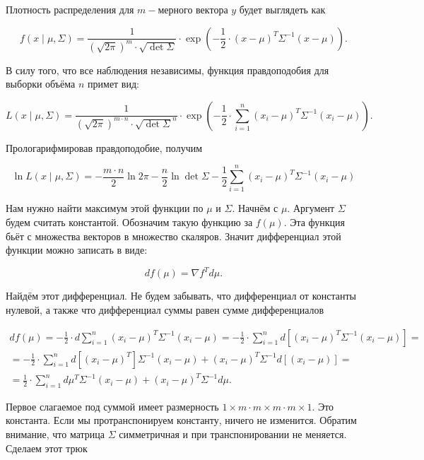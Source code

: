 \begin{sol} 

Плотность распределения для $m-$мерного вектора $y$ будет выглядеть как 
	
	\[ 
	f(x \mid \mu, \Sigma) = \frac{1}{(\sqrt{2 \pi})^m \cdot \sqrt{\det \Sigma}} \cdot \exp \left( - \frac{1}{2} \cdot (x - \mu)^T \Sigma^{-1} (x - \mu) \right).
	\]
	
	В силу того, что все наблюдения независимы, функция правдоподобия для выборки объёма $n$ примет вид: 
	
	\[
	L(x \mid \mu, \Sigma) = \frac{1}{(\sqrt{2 \pi})^{m \cdot n} \cdot \sqrt{\det \Sigma}^n} \cdot \exp \left( - \frac{1}{2} \cdot \sum_{i = 1}^n (x_i - \mu)^T \Sigma^{-1} (x_i - \mu) \right).
	\]
	
	Прологарифмировав правдоподобие, получим
	
	\[
	\ln L(x \mid \mu, \Sigma) = - \frac{m \cdot n}{2} \ln 2 \pi - \frac{n}{2} \ln \det \Sigma - \frac{1}{2} \sum_{i=1}^n (x_i - \mu)^T \Sigma^{-1} (x_i - \mu) 
	\]
	
	Нам нужно найти максимум этой функции по $\mu$  и $\Sigma$.  Начнём с $\mu$.  Аргумент $\Sigma$ будем считать константой. Обозначим такую функцию за $f(\mu)$. Эта функция бьёт с множества векторов в множество скаляров.  Значит дифференциал этой функции можно записать в виде: 
	
	\[ df(\mu) = \nabla f^T d \mu. \]
	
	Найдём этот дифференциал. Не будем забывать, что дифференциал от константы нулевой, а также что дифференциал суммы равен сумме дифференциалов
	
	\begin{multline*}
	d f(\mu) = -\frac{1}{2} \cdot d \sum_{i=1}^n (x_i - \mu)^T \Sigma^{-1} (x_i - \mu) = -\frac{1}{2} \cdot \sum_{i=1}^n d[(x_i - \mu)^T \Sigma^{-1} (x_i - \mu)] = \\ = -\frac{1}{2} \cdot \sum_{i=1}^n d[(x_i - \mu)^T] \Sigma^{-1} (x_i - \mu) + (x_i - \mu)^T \Sigma^{-1} d[(x_i - \mu)] = \\ =   \frac{1}{2} \cdot \sum_{i=1}^n d\mu^T \Sigma^{-1} (x_i - \mu) + (x_i - \mu)^T \Sigma^{-1} d\mu.
	\end{multline*}
	
	Первое слагаемое под суммой имеет размерность $1 \times m \cdot m \times m \cdot m \times 1$. Это константа. Если мы протранспонируем константу, ничего не изменится. Обратим внимание, что матрица $\Sigma$ симметричная и при транспонировании не меняется. Сделаем этот трюк 
	

\end{sol}
